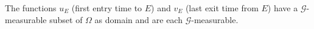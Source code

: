 The functions $u_E$ (first entry time to $E$) and $v_E$ (last exit time from $E$) have a $\mathcal{G}$-measurable subset of $\Omega$ as domain and are each $\mathcal{G}$-measurable.
